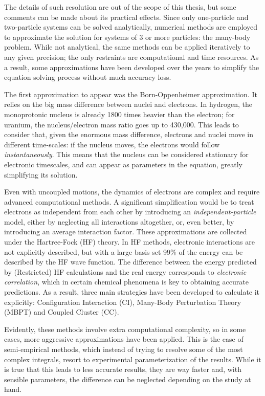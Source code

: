 The details of such resolution are out of the scope of this thesis, but some comments can be made about its practical effects. Since only one-particle and two-particle systems can be solved analytically, numerical methods are employed to approximate the solution for systems of 3 or more particles: the many-body problem. While not analytical, the same methods can be applied iteratively to any given precision; the only restraints are computational and time resources. As a result, some approximations have been developed over the years to simplify the equation solving process without much accuracy loss.

The first approximation to appear was the Born-Oppenheimer approximation. It relies on the big mass difference between nuclei and electrons. In hydrogen, the monoprotonic nucleus is already 1800 times heavier than the electron; for uranium, the nucleus/electron mass ratio goes up to 430,000. This leads to consider that, given the enormous mass difference, electrons and nuclei move in different time-scales: if the nucleus moves, the electrons would follow \textit{instantaneously}. This means that the nucleus can be considered stationary for electronic timescales, and can appear as parameters in the equation, greatly simplifying its solution.

Even with uncoupled motions, the dynamics of electrons are complex and require advanced computational methods. A significant simplification would be to treat electrons as independent from each other by introducing an \textit{independent-particle} model, either by neglecting all interactions altogether, or, even better, by introducing an average interaction factor. These approximations are collected under the Hartree-Fock (HF) theory. In HF methods, electronic interactions are not explicitly described, but with a large basis set 99$\%$  of the energy can be described by the HF wave function. The difference between the energy predicted by (Restricted) HF calculations and the real energy corresponds to \textit{electronic correlation}, which in certain chemical phenomena is key to obtaining accurate predictions. As a result, three main strategies have been developed to calculate it explicitly: Configuration Interaction (CI), Many-Body Perturbation Theory (MBPT) and Coupled Cluster (CC).

Evidently, these methods involve extra computational complexity, so in some cases, more aggressive approximations have been applied. This is the case of semi-empirical methods, which instead of trying to resolve some of the most complex integrals, resort to experimental parameterization of the results. While it is true that this leads to less accurate results, they are way faster and, with sensible parameters, the difference can be neglected depending on the study at hand.

